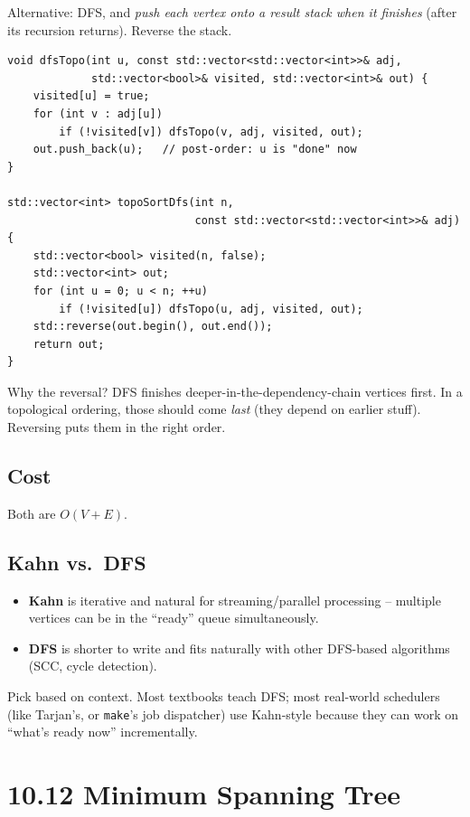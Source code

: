 \documentclass[11pt]{article}
\begin{document}
Alternative: DFS, and \emph{push each vertex onto a result stack when it finishes} (after its recursion returns). Reverse the stack.

\begin{lstlisting}[basicstyle=\ttfamily\small,frame=single]
void dfsTopo(int u, const std::vector<std::vector<int>>& adj,
             std::vector<bool>& visited, std::vector<int>& out) {
    visited[u] = true;
    for (int v : adj[u])
        if (!visited[v]) dfsTopo(v, adj, visited, out);
    out.push_back(u);   // post-order: u is "done" now
}

std::vector<int> topoSortDfs(int n,
                             const std::vector<std::vector<int>>& adj) {
    std::vector<bool> visited(n, false);
    std::vector<int> out;
    for (int u = 0; u < n; ++u)
        if (!visited[u]) dfsTopo(u, adj, visited, out);
    std::reverse(out.begin(), out.end());
    return out;
}
\end{lstlisting}

Why the reversal? DFS finishes deeper-in-the-dependency-chain vertices first. In a topological ordering, those should come \emph{last} (they depend on earlier stuff). Reversing puts them in the right order.

\subsection*{Cost}

Both are $O(V + E)$.

\subsection*{Kahn vs.\ DFS}

\begin{itemize}[leftmargin=*]
    \item \textbf{Kahn} is iterative and natural for streaming/parallel processing -- multiple vertices can be in the ``ready'' queue simultaneously.
    \item \textbf{DFS} is shorter to write and fits naturally with other DFS-based algorithms (SCC, cycle detection).
\end{itemize}

Pick based on context. Most textbooks teach DFS; most real-world schedulers (like Tarjan's, or \texttt{make}'s job dispatcher) use Kahn-style because they can work on ``what's ready now'' incrementally.

\section{10.12 Minimum Spanning Tree}
\end{document}
